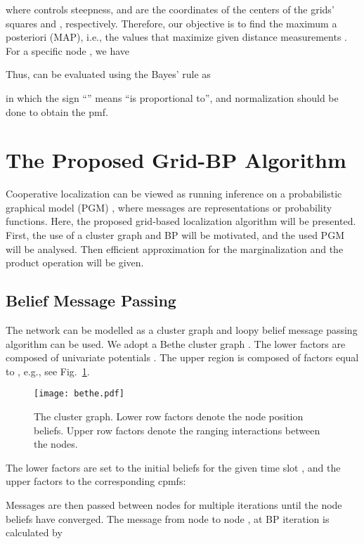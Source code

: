 \documentclass[10pt, final, journal]{IEEEtran}
\begin{document}
where  controls steepness,  and  are the coordinates of the centers of the grids' squares  and , respectively. Therefore, our objective is to find the maximum a posteriori (MAP), i.e., the values that maximize  given distance measurements . For a specific node , we have

Thus,  can be evaluated using the Bayes' rule as

in which the sign ``'' means ``is proportional to'', and normalization should be done to obtain the pmf.

\section{The Proposed Grid-BP Algorithm}\label{mgrs-bpalgorithm}
Cooperative localization can be viewed as running inference on a probabilistic graphical model (PGM) \cite{Wymeersch:2009hv}, where messages are representations or probability functions. Here, the proposed grid-based localization algorithm will be presented. First, the use of a cluster graph and BP will be motivated, and the used PGM will be analysed. Then efficient approximation for the marginalization and the product operation will be given.

\vspace{-.1in}
\subsection{Belief Message Passing}\label{beliefmessagepassing}
The network can be modelled as a cluster graph and loopy belief message passing algorithm can be used. We adopt a Bethe cluster graph \cite{Koller:2009tn}. The lower factors are composed of univariate potentials . The upper region is composed of factors equal to , e.g., see Fig.~\ref{fig:clustergraph}.

\begin{figure}[!ht]
\centering
\texttt{[image: bethe.pdf]}
\caption{The cluster graph. Lower row factors denote the node position beliefs. Upper row factors denote the ranging interactions between the nodes.}\label{fig:clustergraph}
\end{figure}

The lower factors are set to the initial beliefs for the given time slot , and the upper factors to the corresponding cpmfs:


Messages are then passed between nodes for multiple iterations until the node beliefs have converged. The message from node  to node , at BP iteration  is calculated by
\end{document}
